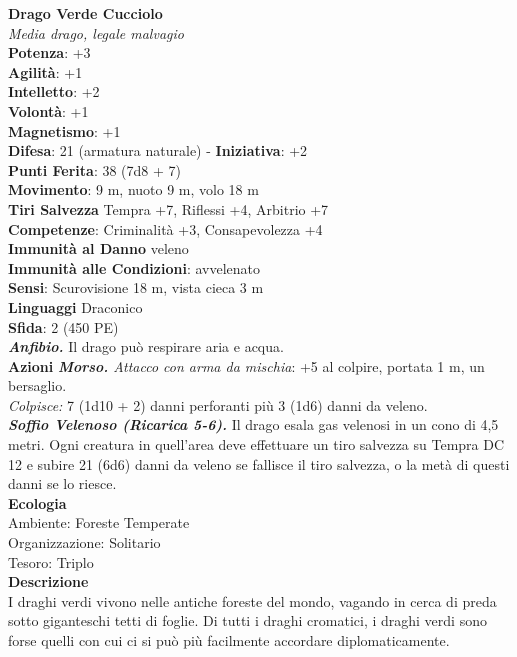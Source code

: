 \begin{multicols}{2}
\medskip\textbf{Drago Verde Cucciolo}\\
\emph{Media drago, legale malvagio}\\
\textbf{Potenza}: +3\\
\textbf{Agilità}: +1\\
\textbf{Intelletto}: +2\\
\textbf{Volontà}: +1\\
\textbf{Magnetismo}: +1\\
\textbf{Difesa}: 21 (armatura naturale) - \textbf{Iniziativa}: +2\\
\textbf{Punti Ferita}: 38 (7d8 + 7)\\
\textbf{Movimento}: 9 m, nuoto 9 m, volo 18 m\\
\textbf{Tiri Salvezza} Tempra +7, Riflessi +4, Arbitrio +7\\
\textbf{Competenze}: Criminalità +3, Consapevolezza +4\\
\textbf{Immunità al Danno} veleno \\
\textbf{Immunità alle Condizioni}: avvelenato\\
\textbf{Sensi}: Scurovisione 18 m, vista cieca 3 m \\
\textbf{Linguaggi} Draconico\\
\textbf{Sfida}: 2 (450 PE)\smallskip\\
\emph{\textbf{Anfibio.}} Il drago può respirare aria e acqua.\\
\smallskip\textbf{Azioni}
\emph{\textbf{Morso.} Attacco con arma da mischia}: +5 al colpire, portata 1 m, un bersaglio.\\
\emph{Colpisce:} 7 (1d10 + 2) danni perforanti più 3 (1d6) danni da veleno.\\
\emph{\textbf{Soffio Velenoso (Ricarica 5-6).}} Il drago esala gas velenosi in un cono di 4,5 metri. Ogni creatura in quell'area deve effettuare un tiro salvezza su Tempra DC  12 e subire 21 (6d6) danni da veleno se fallisce il tiro salvezza, o la metà di questi danni se lo riesce.\\
\textbf{Ecologia}\\
Ambiente: Foreste Temperate\\
Organizzazione: Solitario\\
Tesoro: Triplo\\
\textbf{Descrizione}\\
I draghi verdi vivono nelle antiche foreste del mondo, vagando in cerca di preda sotto giganteschi tetti di foglie. Di tutti i draghi cromatici, i draghi verdi sono forse quelli con cui ci si può più facilmente accordare diplomaticamente.\\


\end{multicols}
